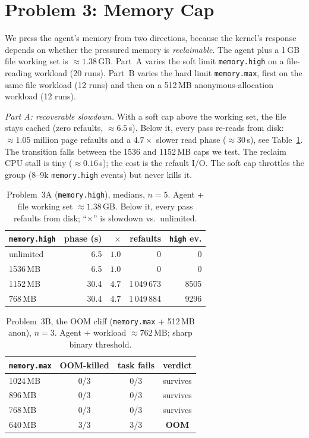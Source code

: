 \documentclass[10pt,twocolumn]{article}
\newcommand{\uu}[1]{\,\textsf{#1}}
\begin{document}
\section{Problem 3: Memory Cap}
\label{sec:mem}

We press the agent's memory from two directions, because the kernel's
response depends on whether the pressured memory is \emph{reclaimable}. The
agent plus a 1\,GB file working set is ${\approx}1.38$\,GB. Part~A varies
the soft limit \texttt{memory.high} on a file-reading workload (20 runs).
Part~B varies the hard limit \texttt{memory.max}, first on the same file
workload (12 runs) and then on a 512\,MB anonymous-allocation workload (12
runs).

\emph{Part A: recoverable slowdown.} With a soft cap above the working set,
the file stays cached (zero refaults, ${\approx}6.5$\uu{s}). Below it, every
pass re-reads from disk: ${\approx}1.05$ million page refaults and a
$4.7\times$ slower read phase (${\approx}30$\uu{s}), see
Table~\ref{tab:mem}. The transition falls between the 1536 and 1152\,MB
caps we test. The reclaim CPU stall is tiny (${\approx}0.16$\uu{s}); the
cost is the refault I/O. The soft cap throttles the group (8--9k
\texttt{memory.high} events) but never kills it.

\begin{table}[t]\centering\footnotesize
\setlength{\tabcolsep}{4pt}
\caption{Problem~3A (\texttt{memory.high}), medians, $n{=}5$. Agent + file
working set ${\approx}1.38$\,GB. Below it, every pass refaults from disk;
``$\times$'' is slowdown vs.\ unlimited.}
\label{tab:mem}
\begin{tabular}{@{}lrrrr@{}}
\toprule
\texttt{memory.high} & phase (s) & $\times$ & refaults & \texttt{high} ev.\\
\midrule
unlimited & 6.5  & $1.0$ & 0            & 0 \\
1536\,MB  & 6.5  & $1.0$ & 0            & 0 \\
1152\,MB  & 30.4 & $4.7$ & 1\,049\,673  & 8505 \\
768\,MB   & 30.4 & $4.7$ & 1\,049\,884  & 9296 \\
\bottomrule
\end{tabular}
\end{table}

\begin{table}[t]\centering\footnotesize
\setlength{\tabcolsep}{4pt}
\caption{Problem~3B, the OOM cliff (\texttt{memory.max} + 512\,MB anon),
$n{=}3$. Agent + workload ${\approx}762$\,MB; sharp binary threshold.}
\label{tab:cliff}
\begin{tabular}{@{}lccc@{}}
\toprule
\texttt{memory.max} & OOM-killed & task fails & verdict\\
\midrule
1024\,MB & 0/3 & 0/3 & survives \\
896\,MB  & 0/3 & 0/3 & survives \\
768\,MB  & 0/3 & 0/3 & survives \\
640\,MB  & 3/3 & 3/3 & \textbf{OOM} \\
\bottomrule
\end{tabular}
\end{table}
\end{document}

